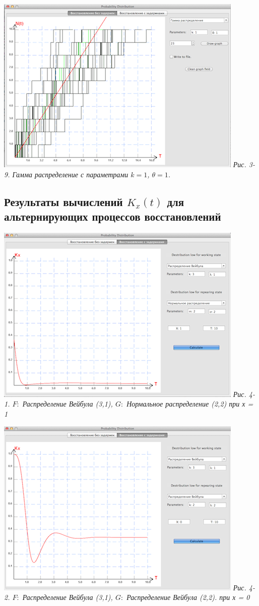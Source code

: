 \includegraphics{3-9.png} 
\textit{Рис. 3-9. Гамма распределение с параметрами $k = 1$, $\theta = 1$.}

\begin{center}
\item\subsection{Результаты вычислений $K_x(t)$ для альтернирующих процессов восстановлений}
\end{center}

\includegraphics{4-1.png} 
\textit{Рис. 4-1. $F:$ Распределение Вейбула (3,1), $G:$ Нормальное распределение (2,2) при х = 1}

\includegraphics{4-2.png} 
\textit{Рис. 4-2. $F:$ Распределение Вейбула (3,1), $G:$ Распределение Вейбула (2,2). при х  = 0}

